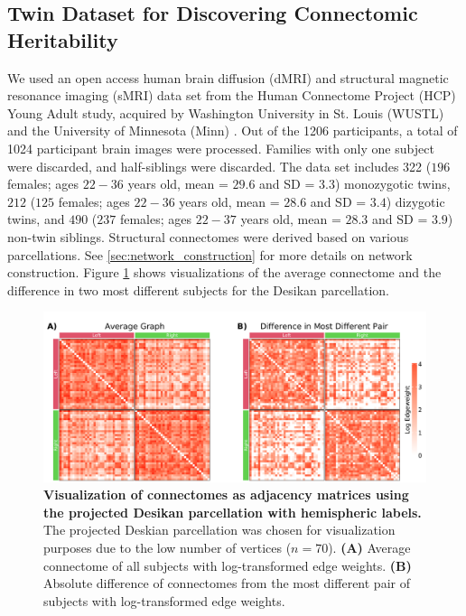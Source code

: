 
\subsection{Twin Dataset for Discovering Connectomic Heritability}
We used an open access human brain diffusion (dMRI) and structural magnetic resonance imaging (sMRI) data set from the Human Connectome Project (HCP) Young Adult study, acquired by Washington University in St. Louis (WUSTL) and the University of Minnesota (Minn) \cite{hcp1, hcp2}. Out of the 1206 participants, a total of 1024 participant brain images were processed. Families with only one subject were discarded, and half-siblings were discarded. The data set includes 322 ($196$ females; ages $22-36$ years old, mean = $29.6$ and SD = $3.3$) monozygotic twins, $212$ ($125$ females; ages $22-36$ years old, mean = $28.6$ and SD = $3.4$) dizygotic twins, and $490$ ($237$ females; ages $22-37$ years old, mean = $28.3$ and SD = $3.9$) non-twin siblings. Structural connectomes were derived based on various parcellations. See \ref{sec:network_construction} for more details on network construction. Figure \ref{fig:data} shows visualizations of the average connectome and the difference in two most different subjects for the Desikan parcellation. 

\begin{figure}
    \centering
    \includegraphics[width=\linewidth]{figures/herit/3-composite.pdf}
    \caption{\textbf{Visualization of connectomes as adjacency matrices using the projected Desikan parcellation with hemispheric labels.}  The projected Deskian parcellation was chosen for visualization purposes due to the low number of vertices ($n=70$). 
    \textbf{(A)} Average connectome of all subjects with log-transformed edge weights. 
    \textbf{(B)} Absolute difference of connectomes from the most different pair of subjects with log-transformed edge weights.}
    \label{fig:data}
\end{figure}

